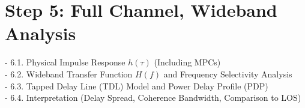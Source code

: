 \chapter{Step 5: Full Channel, Wideband Analysis}
- 6.1. Physical Impulse Response $h(\tau)$ (Including MPCs)\\
- 6.2. Wideband Transfer Function $H(f)$ and Frequency Selectivity Analysis\\
- 6.3. Tapped Delay Line (TDL) Model and Power Delay Profile (PDP)\\
- 6.4. Interpretation (Delay Spread, Coherence Bandwidth, Comparison to LOS)\\